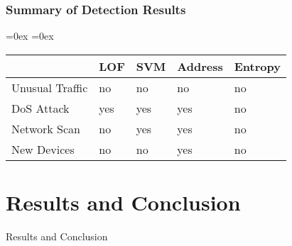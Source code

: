 \begin{frame}[c]
	\frametitle{Summary of Detection Results}
	
	\begin{table}[h]
		\aboverulesep=0ex
		\belowrulesep=0ex
		\renewcommand{\arraystretch}{1.2}
		
		\centering
		\begin{tabularx}{0.95\textwidth}{|l|Y|Y|Y|Y|}
			\toprule
			& LOF & SVM & Address & Entropy \\\midrule
			Unusual Traffic & no & no & no & no \\\midrule
			DoS Attack & yes & yes & yes & no \\\midrule
			Network Scan & no & yes & yes & no \\\midrule
			New Devices & no & no & yes & no \\\midrule
		\end{tabularx}
	\end{table}
\end{frame}

\section{Results and Conclusion}
\begin{frame}[c]
	\centering
	\LARGE Results and Conclusion
	
	\note{}
\end{frame}

